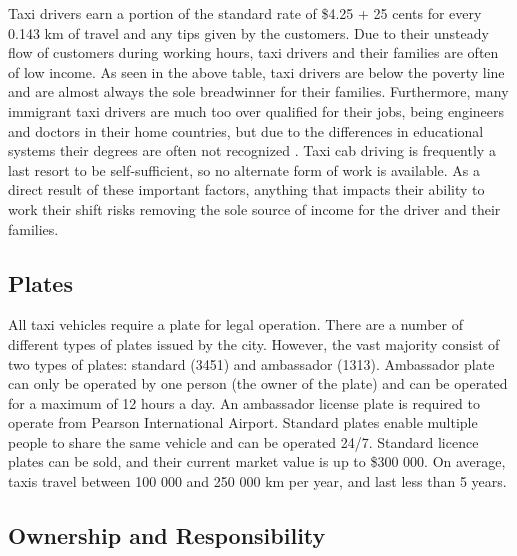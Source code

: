 \documentclass[11pt]{article}
\begin{document}
Taxi drivers earn a portion of the standard rate of \$4.25 + 25 cents for every 0.143 km of 
travel\cite{thestar2012} and any tips given by the customers. Due to their unsteady flow of 
customers during working hours, taxi drivers and their families are
often of low income. As seen in the above table, taxi drivers
are below the poverty line and are almost always the sole breadwinner
for their families\cite{Abdiphone}. Furthermore, many immigrant taxi
drivers are much too over qualified for their jobs, being engineers
and doctors in their home countries, but due to the differences
in educational systems their degrees are often not recognized
\cite{Abdiphone}. Taxi cab driving is frequently a last
resort to be self-sufficient, so no alternate form of work is available. As a direct result of these important factors,
anything that impacts their ability to work their shift risks removing
the sole source of income for the driver and their families. 

\subsection{Plates}
All taxi vehicles require a plate for legal operation. There are a number of different types of plates issued by the city. However, the vast majority 
consist of two types of plates: standard (3451) and ambassador (1313)\cite{thestar2012}. 
Ambassador plate can only be operated by one person (the owner of the plate) and can be 
operated for a maximum of 12 hours a day. An ambassador license plate is required to 
operate from Pearson International Airport. Standard plates enable multiple people to share the same vehicle
and can be operated 24/7. Standard licence plates can be sold, and their
current market value is up to \$300 000\cite{thestar2012}. On average, taxis travel between 100 000 and 
250 000 km per year\cite{thestar2012}, and last less than 5 years\cite{thestar2012}. 


\subsection{Ownership and Responsibility}
\end{document}
